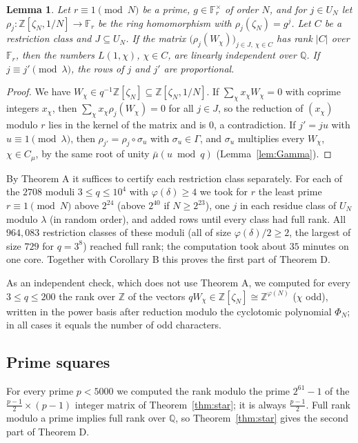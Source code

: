 \documentclass[11pt]{amsart}
\newtheorem{lemma}[theorem]{Lemma}
\theoremstyle{definition}
\theoremstyle{remark}
\providecommand{\Q}{\mathbb Q}
\providecommand{\Z}{\mathbb Z}
\providecommand{\F}{\mathbb F}
\numberwithin{equation}{section}
\begin{document}
\begin{lemma}\label{lem:certificate}
Let $r\equiv1\pmod N$ be a prime, $g\in\F_r^\times$ of order $N$, and for $j\in U_N$ let $\rho_j:\Z[\zeta_N,1/N]\to\F_r$ be the ring homomorphism with $\rho_j(\zeta_N)=g^j$.
Let $C$ be a restriction class and $J\subseteq U_N$.
If the matrix $\bigl(\rho_j(W_\chi)\bigr)_{j\in J,\ \chi\in C}$ has rank $|C|$ over $\F_r$, then the numbers $L(1,\chi)$, $\chi\in C$, are linearly independent over $\Q$.
If $j\equiv j'\pmod\lambda$, the rows of $j$ and $j'$ are proportional.
\end{lemma}

\begin{proof}
We have $W_\chi\in q^{-1}\Z[\zeta_N]\subseteq\Z[\zeta_N,1/N]$.
If $\sum_\chi x_\chi W_\chi=0$ with coprime integers $x_\chi$, then $\sum_\chi x_\chi\rho_j(W_\chi)=0$ for all $j\in J$, so the reduction of $(x_\chi)$ modulo $r$ lies in the kernel of the matrix and is $0$, a contradiction.
If $j'=ju$ with $u\equiv1\pmod\lambda$, then $\rho_{j'}=\rho_j\circ\sigma_u$ with $\sigma_u\in\Gamma$, and $\sigma_u$ multiplies every $W_\chi$, $\chi\in C_\mu$, by the same root of unity $\bar\mu(u\bmod q)$ (Lemma~\ref{lem:Gamma}).
\end{proof}

By Theorem A it suffices to certify each restriction class separately.
For each of the $2708$ moduli $3\le q\le10^4$ with $\varphi(\delta)\ge4$ we took for $r$ the least prime $r\equiv1\pmod N$ above $2^{24}$ (above $2^{40}$ if $N\ge2^{23}$), one $j$ in each residue class of $U_N$ modulo $\lambda$ (in random order), and added rows until every class had full rank.
All $964{,}083$ restriction classes of these moduli (all of size $\varphi(\delta)/2\ge2$, the largest of size $729$ for $q=3^8$) reached full rank; the computation took about $35$ minutes on one core.
Together with Corollary B this proves the first part of Theorem D.

As an independent check, which does not use Theorem A, we computed for every $3\le q\le200$ the rank over $\Z$ of the vectors $qW_\chi\in\Z[\zeta_N]\cong\Z^{\varphi(N)}$ ($\chi$ odd), written in the power basis after reduction modulo the cyclotomic polynomial $\Phi_N$; in all cases it equals the number of odd characters.

\subsection{Prime squares}
For every prime $p<5000$ we computed the rank modulo the prime $2^{61}-1$ of the $\frac{p-1}2\times(p-1)$ integer matrix of Theorem~\ref{thm:star}; it is always $\frac{p-1}2$.
Full rank modulo a prime implies full rank over $\Q$, so Theorem~\ref{thm:star} gives the second part of Theorem D.
\end{document}
